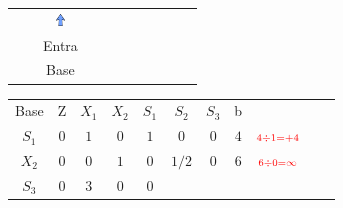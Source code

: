 \begin{frame}
{\begin{table}
\begin{tabular}{c c c c c c c c c c c}
				\cline{1-8}
				& 
				& \includegraphics[width=0.3cm,height=0.3cm]{setacima.jpg}
				& 
				& 
				& 
				& 
				&  
				&
				&
				& \\ 
				& 
				& \scriptsize \color{red} Entra
				&  
				& 
				& 
				& 
				&  
				&
				&
				& \\
				& 
				& \scriptsize \color{red} Base
				&  
				& 
				& 
				& 
				&  
				&
				&
				& \\
			\end{tabular}
		\end{table}			
	}	
	{		
		\begin{table}		
			\begin{tabular}{c c c c c c c c c c c}
				\cline{1-8} 
				\cellcolor{blue!100} \color{white} \scriptsize Base 
				&\cellcolor{blue!100} \color{white} \scriptsize Z 
				&\cellcolor{blue!100} \color{white} $\scriptstyle X_1$ 
				&\cellcolor{blue!100} \color{red} $\scriptstyle X_2$ 
				&\cellcolor{blue!100} \color{red} $\scriptstyle S_1$ 
				&\cellcolor{blue!100} \color{white} $\scriptstyle S_2$ 
				&\cellcolor{blue!100} \color{red} $\scriptstyle S_3$ 
				&\cellcolor{blue!100} \color{white} \scriptsize b
				&
				&
				& \\
				\cline{1-8}
				\cellcolor{blue!100} \color{red} $\scriptstyle S_1$
				& \cellcolor{yellow!50} $\scriptstyle 0$
				& \cellcolor{gray!50} $\scriptstyle 1$
				& \cellcolor{yellow!50} $\scriptstyle 0$
				& \cellcolor{yellow!50} $\scriptstyle 1$
				& \cellcolor{yellow!50} $\scriptstyle 0$
				& \cellcolor{yellow!50} $\scriptstyle 0$
				& \cellcolor{gray!50} $\scriptstyle 4$
				& $\scriptstyle  \color{red} 4 \div 1 = +4$
				& 
				& \\
				\cline{1-8} 
			    \cellcolor{blue!100} \color{red} $\scriptstyle X_2$
				& \cellcolor{yellow!50} $\scriptstyle 0$
				& \cellcolor{gray!50} $\scriptstyle 0$
				& \cellcolor{yellow!50} $\scriptstyle 1$
				& \cellcolor{yellow!50} $\scriptstyle 0$			
				& \cellcolor{yellow!50} $\scriptstyle 1/2$
				& \cellcolor{yellow!50} $\scriptstyle 0$
				& \cellcolor{gray!50} $\scriptstyle 6$
				& $\scriptstyle  \color{red} 6 \div 0 = \infty$
				&
				& \\
				\cline{1-8} 
				\cellcolor{blue!100} \color{red} $\scriptstyle S_3$
				& \cellcolor{gray!50} $\scriptstyle 0$
				& \cellcolor{gray!50} $\scriptstyle 3$
				& \cellcolor{gray!50} $\scriptstyle 0$
				& \cellcolor{gray!50} $\scriptstyle 0$

\end{tabular}
\end{table}}
\end{frame}
